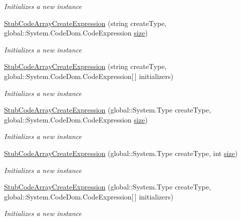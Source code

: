 \begin{DoxyCompactItemize}
\begin{DoxyCompactList}\small\item\em Initializes a new instance\end{DoxyCompactList}\item 
\hyperlink{class_system_1_1_code_dom_1_1_fakes_1_1_stub_code_array_create_expression_ad6aed0c52498bd749e9b0197e9baaac3}{Stub\-Code\-Array\-Create\-Expression} (string create\-Type, global\-::\-System.\-Code\-Dom.\-Code\-Expression \hyperlink{jquery-1_810_82_8js_afa6806c6ee5e63d5177f1dcc082ba6bc}{size})
\begin{DoxyCompactList}\small\item\em Initializes a new instance\end{DoxyCompactList}\item 
\hyperlink{class_system_1_1_code_dom_1_1_fakes_1_1_stub_code_array_create_expression_ad9e837e9437780d6832f429822870b18}{Stub\-Code\-Array\-Create\-Expression} (string create\-Type, global\-::\-System.\-Code\-Dom.\-Code\-Expression\mbox{[}$\,$\mbox{]} initializers)
\begin{DoxyCompactList}\small\item\em Initializes a new instance\end{DoxyCompactList}\item 
\hyperlink{class_system_1_1_code_dom_1_1_fakes_1_1_stub_code_array_create_expression_aee535325a60010eb4de5143bd896193d}{Stub\-Code\-Array\-Create\-Expression} (global\-::\-System.\-Type create\-Type, global\-::\-System.\-Code\-Dom.\-Code\-Expression \hyperlink{jquery-1_810_82_8js_afa6806c6ee5e63d5177f1dcc082ba6bc}{size})
\begin{DoxyCompactList}\small\item\em Initializes a new instance\end{DoxyCompactList}\item 
\hyperlink{class_system_1_1_code_dom_1_1_fakes_1_1_stub_code_array_create_expression_ae142adb185562d6bbec95601b36938e2}{Stub\-Code\-Array\-Create\-Expression} (global\-::\-System.\-Type create\-Type, int \hyperlink{jquery-1_810_82_8js_afa6806c6ee5e63d5177f1dcc082ba6bc}{size})
\begin{DoxyCompactList}\small\item\em Initializes a new instance\end{DoxyCompactList}\item 
\hyperlink{class_system_1_1_code_dom_1_1_fakes_1_1_stub_code_array_create_expression_a08f26c97a369489effc272d16c56a6cf}{Stub\-Code\-Array\-Create\-Expression} (global\-::\-System.\-Type create\-Type, global\-::\-System.\-Code\-Dom.\-Code\-Expression\mbox{[}$\,$\mbox{]} initializers)
\begin{DoxyCompactList}\small\item\em Initializes a new instance\end{DoxyCompactList}\end{DoxyCompactItemize}
